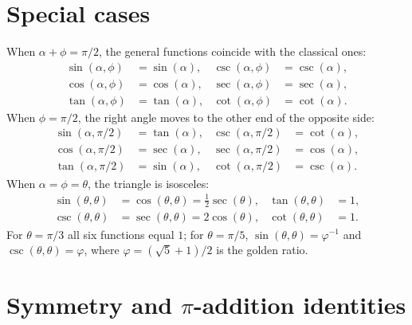 \section{Special cases}\label{app:gs-special}

When $\alpha + \phi = \pi/2$, the general functions coincide with the classical ones:
\begin{align}
\sin(\alpha, \phi) &= \sin(\alpha), & \csc(\alpha, \phi) &= \csc(\alpha), \\
\cos(\alpha, \phi) &= \cos(\alpha), & \sec(\alpha, \phi) &= \sec(\alpha), \\
\tan(\alpha, \phi) &= \tan(\alpha), & \cot(\alpha, \phi) &= \cot(\alpha).
\end{align}
When $\phi = \pi/2$, the right angle moves to the other end of the opposite side:
\begin{align}
\sin(\alpha, \pi/2) &= \tan(\alpha), & \csc(\alpha, \pi/2) &= \cot(\alpha), \\
\cos(\alpha, \pi/2) &= \sec(\alpha), & \sec(\alpha, \pi/2) &= \cos(\alpha), \\
\tan(\alpha, \pi/2) &= \sin(\alpha), & \cot(\alpha, \pi/2) &= \csc(\alpha).
\end{align}
When $\alpha = \phi = \theta$, the triangle is isosceles:
\begin{align}
\sin(\theta, \theta) &= \cos(\theta, \theta) = \tfrac{1}{2}\sec(\theta), & \tan(\theta, \theta) &= 1, \\
\csc(\theta, \theta) &= \sec(\theta, \theta) = 2\cos(\theta), & \cot(\theta, \theta) &= 1.
\end{align}
For $\theta = \pi/3$ all six functions equal $1$; for $\theta = \pi/5$, $\sin(\theta, \theta) = \varphi^{-1}$ and $\csc(\theta, \theta) = \varphi$, where $\varphi = (\sqrt{5} + 1)/2$ is the golden ratio.

\section{Symmetry and \texorpdfstring{$\pi$}{pi}-addition identities}\label{app:gs-symmetry}

